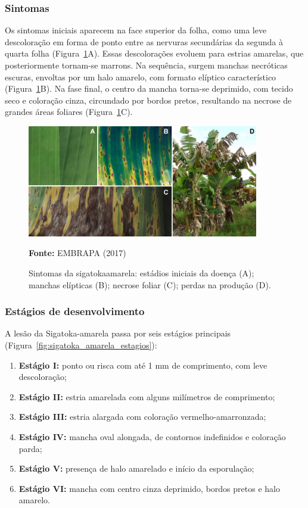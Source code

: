 \subsubsection*{Sintomas}

Os sintomas iniciais aparecem na face superior da folha, como uma leve descoloração em forma de ponto entre as nervuras secundárias da segunda à quarta folha (Figura~\ref{fig:sigatoka_amarela}A). Essas descolorações evoluem para estrias amarelas, que posteriormente tornam-se marrons. Na sequência, surgem manchas necróticas escuras, envoltas por um halo amarelo, com formato elíptico característico (Figura~\ref{fig:sigatoka_amarela}B). Na fase final, o centro da mancha torna-se deprimido, com tecido seco e coloração cinza, circundado por bordos pretos, resultando na necrose de grandes áreas foliares (Figura~\ref{fig:sigatoka_amarela}C).

\begin{figure}[h]
    \centering
    \includegraphics[width=0.9\textwidth]{figuras/capitulo 3/amarela.png}
    \caption{Sintomas da sigatokaamarela: estádios iniciais da doença
(A); manchas elípticas (B); necrose foliar (C); perdas na produção (D).
}
    \label{fig:sigatoka_amarela}
    \small{\textbf{Fonte:} EMBRAPA (2017)}
\end{figure}

\subsubsection*{Estágios de desenvolvimento}

A lesão da Sigatoka-amarela passa por seis estágios principais (Figura~\ref{fig:sigatoka_amarela_estagios}):

\begin{enumerate}
    \item \textbf{Estágio I:} ponto ou risca com até 1 mm de comprimento, com leve descoloração;
    \item \textbf{Estágio II:} estria amarelada com alguns milímetros de comprimento;
    \item \textbf{Estágio III:} estria alargada com coloração vermelho-amarronzada;
    \item \textbf{Estágio IV:} mancha oval alongada, de contornos indefinidos e coloração parda;
    \item \textbf{Estágio V:} presença de halo amarelado e início da esporulação;
    \item \textbf{Estágio VI:} mancha com centro cinza deprimido, bordos pretos e halo amarelo.
\end{enumerate}

